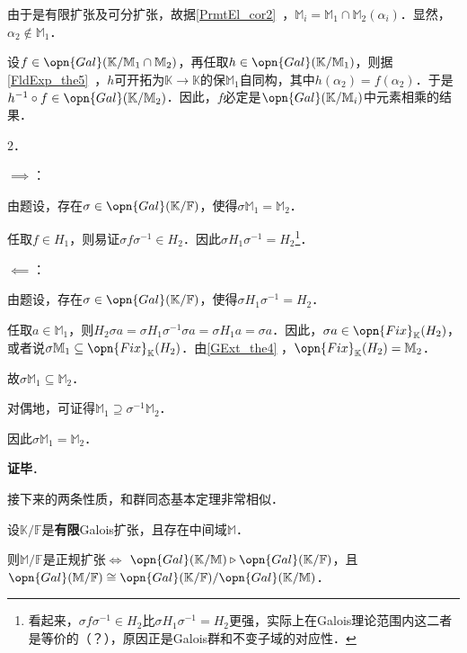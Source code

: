 由于是有限扩张及可分扩张，故据\autoref{PrmtEl_cor2}~，$\mathbb{M}_i=\mathbb{M}_1\cap\mathbb{M}_2(\alpha_i)$．显然，$\alpha_2\not\in\mathbb{M}_1$．

设$f\in\opn{Gal}(\mathbb{K}/\mathbb{M}_1\cap\mathbb{M}_2)$，再任取$h\in\opn{Gal}(\mathbb{K}/\mathbb{M}_1)$，则据\autoref{FldExp_the5}~，$h$可开拓为$\mathbb{K}\to\mathbb{K}$的保$\mathbb{M}_1$自同构，其中$h(\alpha_2)=f(\alpha_2)$．于是$h^{-1}\circ f\in\opn{Gal}(\mathbb{K}/\mathbb{M}_2)$．因此，$f$必定是$\opn{Gal}(\mathbb{K}/\mathbb{M}_i)$中元素相乘的结果．

2．

$\implies$：

由题设，存在$\sigma\in\opn{Gal}(\mathbb{K}/\mathbb{F})$，使得$\sigma \mathbb{M}_1=\mathbb{M}_2$．

任取$f\in H_1$，则易证$\sigma f\sigma^{-1}\in H_2$．因此$\sigma H_1\sigma^{-1}=H_2$\footnote{看起来，$\sigma f\sigma^{-1}\in H_2$比$\sigma H_1\sigma^{-1}=H_2$更强，实际上在Galois理论范围内这二者是等价的（？），原因正是Galois群和不变子域的对应性．}．

$\impliedby$：

由题设，存在$\sigma\in\opn{Gal}(\mathbb{K}/\mathbb{F})$，使得$\sigma H_1\sigma^{-1}=H_2$．

任取$a\in\mathbb{M}_{1}$，则$H_2 \sigma a=\sigma H_1\sigma^{-1}\sigma a=\sigma H_1 a=\sigma a$．因此，$\sigma a\in\opn{Fix}_\mathbb{K}(H_2)$，或者说$\sigma\mathbb{M}_1\subseteq\opn{Fix}_\mathbb{K}(H_2)$．由\autoref{GExt_the4} ，$\opn{Fix}_\mathbb{K}(H_2)=\mathbb{M}_2$．

故$\sigma\mathbb{M}_1\subseteq\mathbb{M}_2$．

对偶地，可证得$\mathbb{M}_1\supseteq\sigma^{-1}\mathbb{M}_2$．

因此$\sigma\mathbb{M}_1=\mathbb{M}_2$．




\textbf{证毕}．




接下来的两条性质，和群同态基本定理非常相似．

\begin{theorem}{}
设$\mathbb{K}/\mathbb{F}$是\textbf{有限}Galois扩张，且存在中间域$\mathbb{M}$．

则$\mathbb{M}/\mathbb{F}$是正规扩张$\iff$ $\opn{Gal}(\mathbb{K/\mathbb{M}})\triangleright\opn{Gal}(\mathbb{K/\mathbb{F}})$，且$\opn{Gal}(\mathbb{M}/\mathbb{F})\cong \opn{Gal}(\mathbb{K}/\mathbb{F})/\opn{Gal}(\mathbb{K}/\mathbb{M})$．
\end{theorem}

